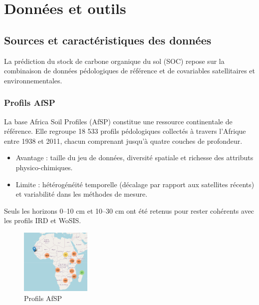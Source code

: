 \documentclass[12pt,a4paper,oneside]{report}
\begin{document}
\chapter{Données et outils}

\section{Sources et caractéristiques des données}
La prédiction du stock de carbone organique du sol (SOC) repose sur la combinaison de données pédologiques de référence et de covariables satellitaires et environnementales.
\subsection{Profils AfSP }
La base Africa Soil Profiles \cite{afsp} (AfSP) constitue une ressource continentale de référence. Elle regroupe 18 533 profils pédologiques collectés à travers l’Afrique entre 1938 et 2011, chacun comprenant jusqu’à quatre couches de profondeur.
\begin{itemize}
  \item Avantage : taille du jeu de données, diversité spatiale et richesse des attributs physico-chimiques.

\item Limite : hétérogénéité temporelle (décalage par rapport aux satellites récents) et variabilité dans les méthodes de mesure.
\end{itemize}
Seuls les horizons 0–10 cm et 10–30 cm ont été retenus pour rester cohérents avec les profils IRD et WoSIS.
\begin{figure}[h]
    \centering
    \includegraphics[width=0.3\textwidth]{images/afsp.png}
    \caption{Profils AfSP}
    \label{fig:afsp}
\end{figure}
\end{document}
